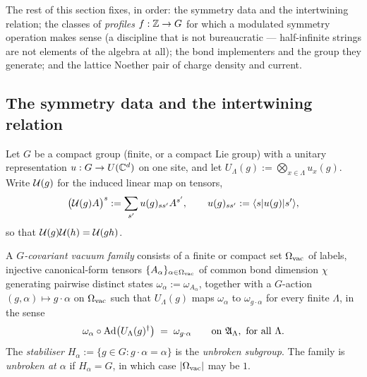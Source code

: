 The rest of this section fixes, in order: the symmetry data and the
intertwining relation; the classes of \emph{profiles} $f : \mathbb{Z} \to G$ for which
a modulated symmetry operation makes sense (a discipline that is not
bureaucratic --- half-infinite strings are not elements of the algebra at all);
the bond implementers and the group they generate; and the lattice Noether pair
of charge density and current.

\subsection{The symmetry data and the intertwining relation}

\begin{definition}
\label{def:onsite-symmetry}
Let $G$ be a compact group (finite, or a compact Lie group) with a unitary
representation $u : G \to U(\mathbb{C}^{d})$ on one site, and let
$U_{\Lambda}(g) := \bigotimes_{x \in \Lambda} u_{x}(g)$. Write $\mathcal{U}(g)$ for
the induced linear map on tensors,
\begin{equation}
  \bigl(\mathcal{U}(g) A\bigr)^{s} := \sum_{s'} u(g)_{s s'} A^{s'},
  \qquad u(g)_{s s'} := \langle s| u(g) |s'\rangle,
\end{equation}
so that $\mathcal{U}(g) \mathcal{U}(h) = \mathcal{U}(gh)$.
\end{definition}

\begin{definition}
\label{def:covariant-vacuum}
A \emph{$G$-covariant vacuum family} consists of a finite or compact set
$\Omega_{\mathrm{vac}}$ of labels, injective canonical-form tensors
$\{A_{\alpha}\}_{\alpha \in \Omega_{\mathrm{vac}}}$ of common bond dimension $\chi$ generating
pairwise distinct states $\omega_{\alpha} := \omega_{A_{\alpha}}$, together
with a $G$-action $(g,\alpha) \mapsto g \cdot \alpha$ on $\Omega_{\mathrm{vac}}$ such that
$U_{\Lambda}(g)$ maps $\omega_{\alpha}$ to $\omega_{g \cdot \alpha}$ for every
finite $\Lambda$, in the sense
\begin{equation}
  \omega_{\alpha} \circ \operatorname{Ad}\bigl(U_{\Lambda}(g)^{\dagger}\bigr)
  \;=\; \omega_{g \cdot \alpha}
  \qquad \text{on } \mathfrak{A}_{\Lambda}, \text{ for all } \Lambda .
\end{equation}
The \emph{stabiliser} $H_{\alpha} := \{ g \in G : g \cdot \alpha = \alpha \}$
is the \emph{unbroken subgroup}. The family is \emph{unbroken at $\alpha$} if
$H_{\alpha} = G$, in which case $\lvert \Omega_{\mathrm{vac}}\rvert$ may be $1$.
\end{definition}

